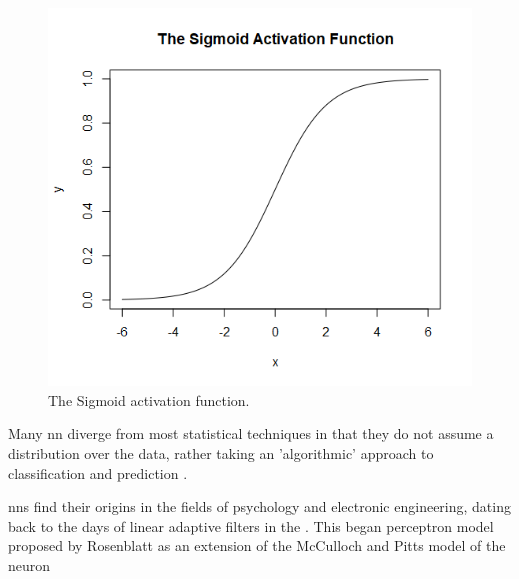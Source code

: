 \begin{figure}
    \includegraphics[scale=0.5]{figs/sigmoid.png}
    \caption{The Sigmoid activation function.}
    \label{fig:sigmoid_function}
\end{figure}

Many \gls{nn} diverge from most statistical techniques in that they do not assume a distribution over the data, rather taking an 'algorithmic' approach to classification and prediction \cite{two_cultures_stats_modeling}.

\gls{nn}s find their origins in the fields of psychology and electronic engineering, dating back to the days of linear adaptive filters in the \cite{nns_haykins}. This began perceptron model proposed by Rosenblatt \cite{perceptron_paper} as an extension of the McCulloch and Pitts model of the neuron \cite{logical_calculus} \bigskip



